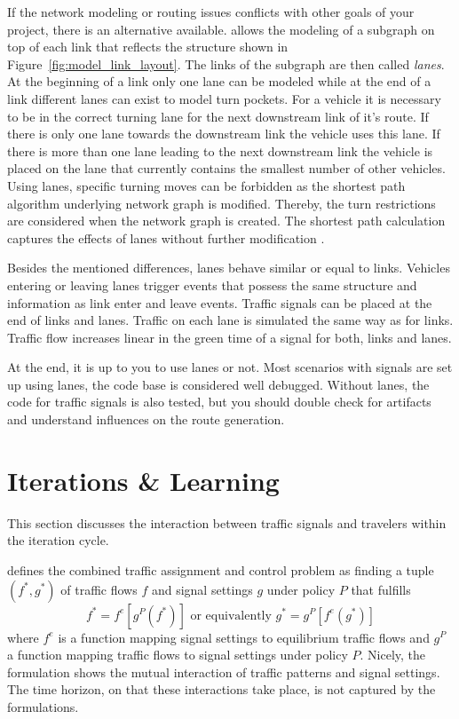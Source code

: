 If the network modeling or routing issues conflicts with other goals of your project, there is an alternative available. 
 allows the modeling of a subgraph on top of each link that reflects the structure shown in Figure~\ref{fig:model_link_layout}. 
The links of the subgraph are then called \emph{lanes}. 
At the beginning of a link only one lane can be modeled while at the end of a link different lanes can exist to model turn pockets. 
For a vehicle it is necessary to be in the correct turning lane for the next downstream link of it's route. 
If there is only one lane towards the downstream link the vehicle uses this lane. 
If there is more than one lane leading to the next downstream link the vehicle is placed on the lane that currently contains the smallest number of other vehicles.
Using lanes, specific turning moves can be forbidden as the shortest path algorithm underlying network graph is modified.  
Thereby, the turn restrictions are considered when the network graph is created.  
The shortest path calculation captures the effects of lanes without further modification \citep[see][pp.~21]{Grether2014PhD}.  

Besides the mentioned differences, lanes behave similar or equal to links.  
Vehicles entering or leaving lanes trigger events that possess the same structure and information as link enter and leave events.
Traffic signals can be placed at the end of links and lanes. 
Traffic on each lane is simulated the same way as for links. 
Traffic flow increases linear in the green time of a signal for both, links and lanes. 

At the end, it is up to you to use lanes or not. 
Most  scenarios with signals are set up using lanes, the code base is considered well debugged. 
Without lanes, the code for traffic signals is also tested, but you should double check for artifacts and understand influences on the route generation. 

\section{Iterations \& Learning}
\label{sec:signals_iterations_learning}
This section discusses the interaction between traffic signals and travelers within the  iteration cycle. 

\citet{Meneguzzer1997ModelReviewTrafficAssignmentSignalControl} defines the combined traffic assignment and control problem as finding a tuple $(f^{*}, g^{*})$ of traffic flows $f$ and signal settings $g$ under policy $P$ that fulfills  
\[
f^{*} = f^{e}[g^{P}(f^{*})] \mbox{  or  equivalently } g^{*} = g^{P}[f^{e}(g^{*})]
\]
where $f^{e}$ is a function mapping signal settings to equilibrium traffic flows and $g^{P}$ a function mapping traffic flows to signal settings under policy $P$.  
Nicely, the formulation shows the mutual interaction of traffic patterns and signal settings.  
The time horizon, on that these interactions take place, is not captured by the formulations. 

